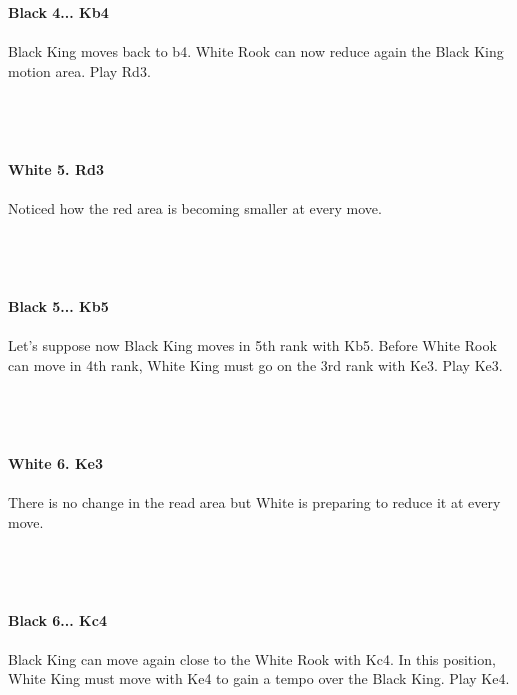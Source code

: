 \documentclass{article}
\begin{document}
\\
\\
\textbf{Black 4... Kb4}\\
\\
Black King moves back to b4. White Rook can now reduce again the Black King motion area. Play Rd3.\\\\
\\

\\
\\
\textbf{White 5. Rd3}\\
\\
Noticed how the red area is becoming smaller at every move.\\\\
\\

\\
\\
\textbf{Black 5... Kb5}\\
\\
Let's suppose now Black King moves in 5th rank with Kb5. Before White Rook can move in 4th rank, White King must go on the 3rd rank with Ke3. Play Ke3.\\\\
\\

\\
\\
\textbf{White 6. Ke3}\\
\\
There is no change in the read area but White is preparing to reduce it at every move.\\\\
\\

\\
\\
\textbf{Black 6... Kc4}\\
\\
Black King can move again close to the White Rook with Kc4. In this position, White King must move with Ke4 to gain a tempo over the Black King. Play Ke4.\\\\
\\

\\
\\
\end{document}
